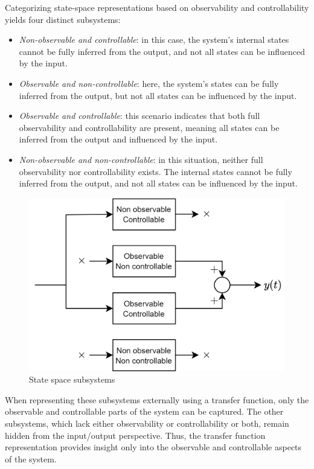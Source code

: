 Categorizing state-space representations based on observability and controllability yields four distinct subsystems:
\begin{itemize}
    \item \textit{Non-observable and controllable}: in this case, the system's internal states cannot be fully inferred from the output, and not all states can be influenced by the input.
    \item \textit{Observable and non-controllable}: here, the system's states can be fully inferred from the output, but not all states can be influenced by the input.
    \item \textit{Observable and controllable}: this scenario indicates that both full observability and controllability are present, meaning all states can be inferred from the output and influenced by the input.
    \item \textit{Non-observable and non-controllable}: in this situation, neither full observability nor controllability exists. 
        The internal states cannot be fully inferred from the output, and not all states can be influenced by the input.
\end{itemize}
\begin{figure}[H]
    \centering
    \includegraphics[width=0.5\linewidth]{images/subblock.png}
    \caption{State space subsystems}
\end{figure}
When representing these subsystems externally using a transfer function, only the observable and controllable parts of the system can be captured. 
The other subsystems, which lack either observability or controllability or both, remain hidden from the input/output perspective. 
Thus, the transfer function representation provides insight only into the observable and controllable aspects of the system.

